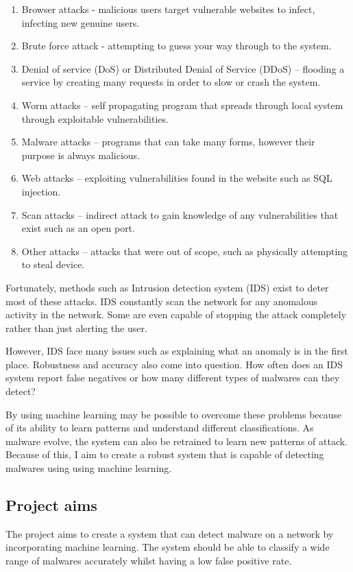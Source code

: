 \documentclass[11pt]{article}
\begin{document}
\begin{enumerate}
  \item Browser attacks - malicious users target vulnerable websites to infect, infecting new genuine users. 
  \item Brute force attack - attempting to guess your way through to the system. 
  \item Denial of service (DoS) or Distributed Denial of Service (DDoS) – flooding a service by creating many requests in order to slow or crash the system.
  \item Worm attacks – self propagating program that spreads through local system through exploitable vulnerabilities.
  \item Malware attacks – programs that can take many forms, however their purpose is always malicious.
  \item Web attacks – exploiting vulnerabilities found in the website such as SQL injection.
  \item Scan attacks – indirect attack to gain knowledge of any vulnerabilities that exist such as an open port. 
  \item Other attacks – attacks that were out of scope, such as physically attempting to steal device.
\end{enumerate}

Fortunately, methods such as Intrusion detection system (IDS) exist to deter most of these attacks. IDS constantly scan the network for any anomalous activity in the network. Some are even capable of stopping the attack completely rather than just alerting the user. 

However, IDS face many issues such as explaining what an anomaly is in the first place. Robustness and accuracy also come into question. How often does an IDS system report false negatives or how many different types of malwares can they detect? 

By using machine learning may be possible to overcome these problems because of its ability to learn patterns and understand different classifications. As malware evolve, the system can also be retrained to learn new patterns of attack. Because of this, I aim to create a robust system that is capable of detecting malwares using using machine learning.

\subsection{Project aims}
The project aims to create a system that can detect malware on a network by incorporating machine learning. The system should be able to classify a wide range of malwares accurately whilst having a low false positive rate. 
\end{document}

